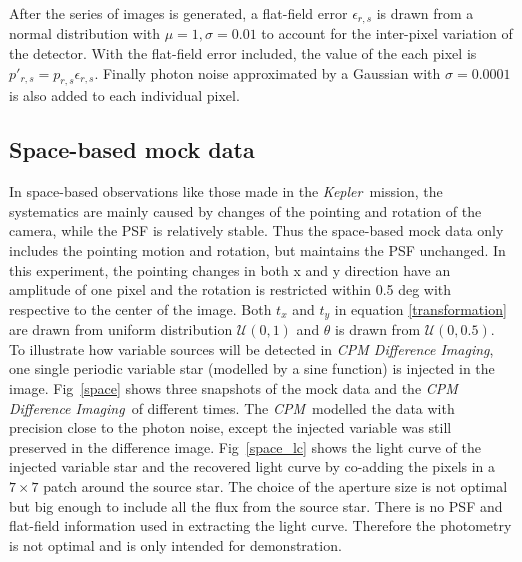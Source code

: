 \documentclass[12pt, preprint]{aastex}
\newcommand{\project}[1]{\textsl{#1}}
\newcommand{\cpm}{\project{CPM}}
\newcommand{\cpmdiff}{\project{CPM Difference Imaging}}
\newcommand{\kepler}{\project{Kepler}}
\begin{document}
After the series of images is generated, a flat-field error $\epsilon_{r,s}$ is drawn from a normal distribution with $\mu=1, \sigma=0.01$ to account for the inter-pixel variation of the detector.
With the flat-field error included, the value of the each pixel is $p'_{r,s} = p_{r,s}\epsilon_{r,s}$.
Finally photon noise approximated by a Gaussian with $\sigma = 0.0001$ is also added to each individual pixel.

\subsection{Space-based mock data}
In space-based observations like those made in the \kepler\ mission, the systematics are mainly caused by changes of the pointing and rotation of the camera, while the PSF is relatively stable. 
Thus the space-based mock data only includes the pointing motion and rotation, but maintains the PSF unchanged.
In this experiment, the pointing changes in both x and y direction have an amplitude of one pixel and the rotation is restricted within 0.5 deg with respective to the center of the image. 
Both $t_x $ and $t_y$ in equation \ref{transformation} are drawn from uniform distribution ${\mathcal {U}}(0,1)$ and $\theta$ is drawn from ${\mathcal {U}}(0,0.5)$. 
To illustrate how variable sources will be detected in \cpmdiff, one single periodic variable star (modelled by a sine function) is injected in the image.
Fig~\ref{space} shows three snapshots of the mock data and the \cpmdiff\ of different times. 
The \cpm\ modelled the data with precision close to the photon noise, except the injected variable was still preserved in the difference image. 
Fig~\ref{space_lc} shows the light curve of the injected variable star and the recovered light curve by co-adding the pixels in a $7\times 7$ patch around the source star.
The choice of the aperture size is not optimal but big enough to include all the flux from the source star. 
There is no PSF and flat-field information used in extracting the light curve. 
Therefore the photometry is not optimal and is only intended for demonstration.
\end{document}
